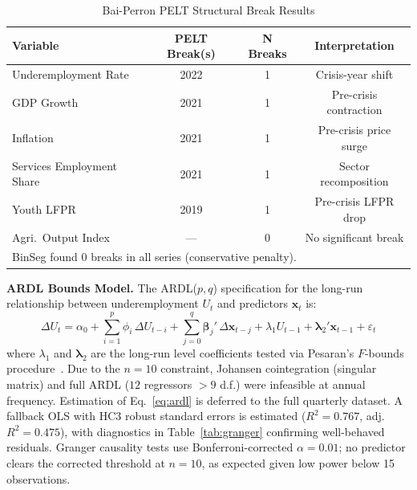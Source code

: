 \documentclass[sigconf]{acmart}
\begin{document}
\begin{table}[h]
\caption{Bai-Perron PELT Structural Break Results}
\label{tab:bp}
\setlength{\tabcolsep}{3pt}
\footnotesize
\begin{tabular}{lccc}
\toprule
\textbf{Variable} & \textbf{PELT Break(s)} & \textbf{N Breaks} & \textbf{Interpretation}\\
\midrule
Underemployment Rate      & 2022 & 1 & Crisis-year shift \\
GDP Growth                & 2021 & 1 & Pre-crisis contraction \\
Inflation                 & 2021 & 1 & Pre-crisis price surge \\
Services Employment Share & 2021 & 1 & Sector recomposition \\
Youth LFPR                & 2019 & 1 & Pre-crisis LFPR drop \\
Agri.\ Output Index       & ---  & 0 & No significant break \\
\midrule
\multicolumn{4}{l}{\scriptsize BinSeg found 0 breaks in all series (conservative penalty).}\\
\bottomrule
\end{tabular}
\end{table}

\textbf{ARDL Bounds Model.} The ARDL($p,q$) specification for the long-run relationship between underemployment $U_t$ and predictors $\mathbf{x}_t$ is:
%
\begin{equation}
  \Delta U_t = \alpha_0 + \sum_{i=1}^{p}\phi_i\,\Delta U_{t-i}
             + \sum_{j=0}^{q}\boldsymbol{\beta}_j'\,\Delta\mathbf{x}_{t-j}
             + \lambda_1 U_{t-1} + \boldsymbol{\lambda}_2'\mathbf{x}_{t-1} + \varepsilon_t
  \label{eq:ardl}
\end{equation}
%
where $\lambda_1$ and $\boldsymbol{\lambda}_2$ are the long-run level coefficients tested via Pesaran's $F$-bounds procedure~\cite{pesaran2001}. Due to the $n{=}10$ constraint, Johansen cointegration (singular matrix) and full ARDL ($12$ regressors $> 9$ d.f.) were infeasible at annual frequency. Estimation of Eq.~\eqref{eq:ardl} is deferred to the full quarterly dataset. A fallback OLS with HC3 robust standard errors is estimated ($R^2{=}0.767$, adj.~$R^2{=}0.475$), with diagnostics in Table~\ref{tab:granger} confirming well-behaved residuals. Granger causality tests use Bonferroni-corrected $\alpha{=}0.01$; no predictor clears the corrected threshold at $n{=}10$, as expected given low power below 15 observations.
\end{document}
